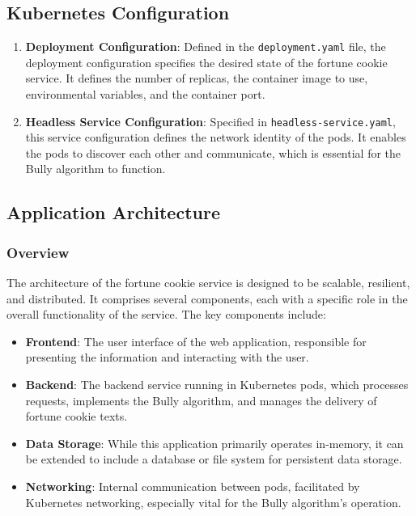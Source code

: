 \documentclass{article}
\begin{document}
  \subsection{Kubernetes Configuration}
    \begin{enumerate}
      \item \textbf{Deployment Configuration}: Defined in the \texttt{deployment.yaml} file, the deployment configuration specifies the desired state of the fortune cookie service. It defines the number of replicas, the container image to use, environmental variables, and the container port.
      \item \textbf{Headless Service Configuration}: Specified in \texttt{headless-service.yaml}, this service configuration defines the network identity of the pods. It enables the pods to discover each other and communicate, which is essential for the Bully algorithm to function.
    \end{enumerate}

  \subsection{Application Architecture}
  \subsubsection*{Overview}
    The architecture of the fortune cookie service is designed to be scalable, resilient, and distributed. It comprises several components, each with a specific role in the overall functionality of the service. The key components include:

    \begin{itemize}
      \item \textbf{Frontend}: The user interface of the web application, responsible for presenting the information and interacting with the user.
      \item \textbf{Backend}: The backend service running in Kubernetes pods, which processes requests, implements the Bully algorithm, and manages the delivery of fortune cookie texts.
      \item \textbf{Data Storage}: While this application primarily operates in-memory, it can be extended to include a database or file system for persistent data storage.
      \item \textbf{Networking}: Internal communication between pods, facilitated by Kubernetes networking, especially vital for the Bully algorithm's operation.
    \end{itemize}
\end{document}
